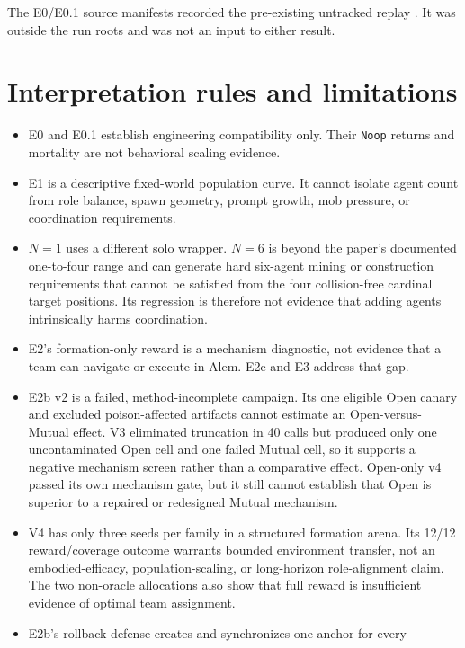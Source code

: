 \documentclass[11pt]{article}
\newcommand{\code}[1]{\texttt{#1}}
\begin{document}
The E0/E0.1 source manifests recorded the pre-existing untracked replay
.  It was outside the run
roots and was not an input to either result.

\section{Interpretation rules and limitations}

\begin{itemize}
  \item E0 and E0.1 establish engineering compatibility only.  Their
  \code{Noop} returns and mortality are not behavioral scaling evidence.
  \item E1 is a descriptive fixed-world population curve.  It cannot isolate
  agent count from role balance, spawn geometry, prompt growth, mob pressure,
  or coordination requirements.
  \item $N=1$ uses a different solo wrapper.  $N=6$ is beyond the paper's
  documented one-to-four range and can generate hard six-agent mining or
  construction requirements that cannot be satisfied from the four
  collision-free cardinal target positions.  Its regression is therefore not
  evidence that adding agents intrinsically harms coordination.
  \item E2's formation-only reward is a mechanism diagnostic, not evidence that
  a team can navigate or execute in Alem.  E2e and E3 address that gap.
  \item E2b v2 is a failed, method-incomplete campaign.  Its one eligible Open
  canary and excluded poison-affected artifacts cannot estimate an Open-versus-
  Mutual effect.  V3 eliminated truncation in 40 calls but produced only one
  uncontaminated Open cell and one failed Mutual cell, so it supports a
  negative mechanism screen rather than a comparative effect.  Open-only v4
  passed its own mechanism gate, but it still cannot establish that Open is
  superior to a repaired or redesigned Mutual mechanism.
  \item V4 has only three seeds per family in a structured formation arena.
  Its 12/12 reward/coverage outcome warrants bounded environment transfer, not
  an embodied-efficacy, population-scaling, or long-horizon role-alignment
  claim.  The two non-oracle allocations also show that full reward is
  insufficient evidence of optimal team assignment.
  \item E2b's rollback defense creates and synchronizes one anchor for every

\end{itemize}
\end{document}
